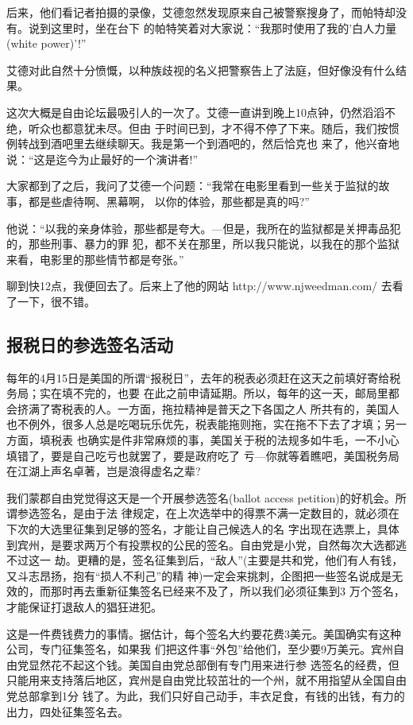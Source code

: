 ﻿\documentclass[11pt]{article}
\begin{document}
后来，他们看记者拍摄的录像，艾德忽然发现原来自己被警察搜身了，而帕特却没有。说到这里时，坐在台下
的帕特笑着对大家说：``我那时使用了我的'白人力量(white power)'!''

艾德对此自然十分愤慨，以种族歧视的名义把警察告上了法庭，但好像没有什么结果。

这次大概是自由论坛最吸引人的一次了。艾德一直讲到晚上10点钟，仍然滔滔不绝，听众也都意犹未尽。但由
于时间已到，才不得不停了下来。随后，我们按惯例转战到酒吧里去继续聊天。我是第一个到酒吧的，然后恰克也
来了，他兴奋地说：``这是迄今为止最好的一个演讲者!''

大家都到了之后，我问了艾德一个问题：``我常在电影里看到一些关于监狱的故事，都是些虐待啊、黑幕啊，
以你的体验，那些都是真的吗?''

他说：``以我的亲身体验，那些都是夸大。---但是，我所在的监狱都是关押毒品犯的，那些刑事、暴力的罪
犯，都不关在那里，所以我只能说，以我在的那个监狱来看，电影里的那些情节都是夸张。''

聊到快12点，我便回去了。后来上了他的网站 http://www.njweedman.com/ 去看了一下，很不错。

\subsection{报税日的参选签名活动}

每年的4月15日是美国的所谓``报税日''，去年的税表必须赶在这天之前填好寄给税务局；实在填不完的，也要
在此之前申请延期。所以，每年的这一天，邮局里都会挤满了寄税表的人。一方面，拖拉精神是普天之下各国之人
所共有的，美国人也不例外，很多人总是吃喝玩乐优先，税表能拖则拖，实在拖不下去了才填；另一方面，填税表
也确实是件非常麻烦的事，美国关于税的法规多如牛毛，一不小心填错了，要是自己吃亏也就罢了，要是政府吃了
亏---你就等着瞧吧，美国税务局在江湖上声名卓著，岂是浪得虚名之辈?

我们蒙郡自由党觉得这天是一个开展参选签名(ballot access petition)的好机会。所谓参选签名，是由于法
律规定，在上次选举中的得票不满一定数目的，就必须在下次的大选里征集到足够的签名，才能让自己候选人的名
字出现在选票上，具体到宾州，是要求两万个有投票权的公民的签名。自由党是小党，自然每次大选都逃不过这一
劫。更糟的是，签名征集到后，``敌人''(主要是共和党，他们有人有钱，又斗志昂扬，抱有``损人不利己''的精
神)一定会来挑刺，企图把一些签名说成是无效的，而那时再去重新征集签名已经来不及了，所以我们必须征集到3
万个签名，才能保证打退敌人的猖狂进犯。

这是一件费钱费力的事情。据估计，每个签名大约要花费3美元。美国确实有这种公司，专门征集签名，如果我
们把这件事``外包''给他们，至少要9万美元。宾州自由党显然花不起这个钱。美国自由党总部倒有专门用来进行参
选签名的经费，但只能用来支持落后地区，宾州是自由党比较茁壮的一个州，就不用指望从全国自由党总部拿到1分
钱了。为此，我们只好自己动手，丰衣足食，有钱的出钱，有力的出力，四处征集签名去。
\end{document}
